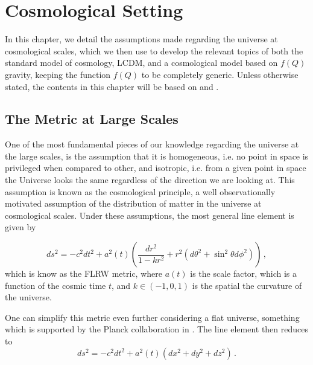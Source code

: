 \chapter{Cosmological Setting}
\label{chap:cosmology}

In this chapter, we detail the assumptions made regarding the universe at cosmological scales, which we then use to develop the relevant topics of both the standard model of cosmology, \gls{LCDM}, and a cosmological model based on $f(Q)$ gravity, keeping the function $f(Q)$ to be completely generic. Unless otherwise stated, the contents in this chapter will be based on \cite{Baumann} and \cite{Dodelson}.


\section{The Metric at Large Scales}
\label{sec:metric}

One of the most fundamental pieces of our knowledge regarding the universe at the large scales, is the assumption that it is homogeneous, i.e. no point in space is privileged when compared to other, and isotropic, i.e. from a given point in space the Universe looks the same regardless of the direction we are looking at. This assumption is known as the cosmological principle, a well observationally motivated assumption of the distribution of matter in the universe at cosmological scales.
Under these assumptions, the most general line element is given by

\begin{equation}
    ds^2 = -c^2 dt^2 + a^2(t) \left( \frac{dr^2}{1-kr^2} + r^2 (d\theta^2 + \sin^2{\theta} d\phi^2) \right) \,,
\end{equation}
which is know as the \gls{FLRW} metric, where $a(t)$ is the scale factor, which is a function of the cosmic time $t$, and $k \in (-1, 0, 1)$ is the spatial the curvature of the universe.

One can simplify this metric even further considering a flat universe, something which is supported by the Planck collaboration in \cite{Planck2018}. The line element then reduces to
\begin{equation}
    \label{eq:FLRW}
    ds^2 = -c^2 dt^2 + a^2(t) (dx^2 + dy^2 + dz^2)  \,.
\end{equation}

